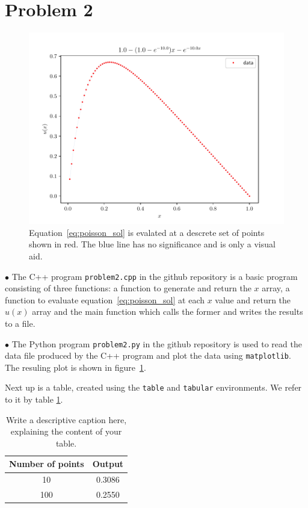 \documentclass[english,notitlepage]{revtex4-1}  %
\begin{document}
\section*{Problem 2}
\begin{figure}%
    \centering %
    \includegraphics[scale=0.55]{../img/problem2-fig-x-u.pdf} %
    \caption{Equation~\ref{eq:poisson_sol} is evalated at a descrete set of points shown in red. 
    The blue line has no significance and is only a visual aid.}
    \label{fig:problem2-fig-x-u}
\end{figure}
\begin{list}{}{}
    \item[$\bullet$] The C++ program \texttt{problem2.cpp} in the github repository is a basic
          program consisting of three functions: a function to generate and return
          the $x$ array, a function to evaluate equation~\ref{eq:poisson_sol} at each $x$ value and return 
          the $u(x)$ array and the main function which calls the former and writes the results to a file.
    \item[$\bullet$] The Python program \texttt{problem2.py} in the github repository is used
          to read the data file produced by the C++ program and plot the data using \texttt{matplotlib}.
          The resuling plot is shown in figure~\ref{fig:problem2-fig-x-u}.  
\end{list}

Next up is a table, created using the \texttt{table} and \texttt{tabular} environments. We refer to it by table \ref{tab:output_table}.
\begin{table}%
    \centering
    \begin{tabular}{c@{\hspace{1cm}} c}
        \hline
        Number of points & Output \\
        \hline
        10 &  0.3086\\
        100 &  0.2550\\
        \hline
    \end{tabular}\caption{Write a descriptive caption here, explaining the content of your table.}\label{tab:output_table}
\end{table}
\end{document}
